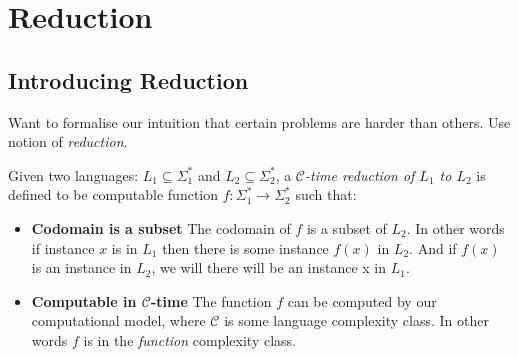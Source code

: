 
\chapter{Reduction}







\section{Introducing Reduction}


Want to formalise our intuition that certain problems are harder than
others. Use notion of \textit{reduction}.

Given two languages: $L_1 \subseteq \Sigma^{*}_1$
and $L_2 \subseteq \Sigma^{*}_2$, a \textit{$\mathcal{C}$-time reduction of $L_1$ to $L_2$}
is defined to be computable function $f : \Sigma^{*}_1 \rightarrow \Sigma^{*}_2$
such that:

\begin{itemize}   
\renewcommand{\labelitemi}{$\Box$}
\item \textbf{Codomain is a subset} The codomain of $f$ is a subset of  $L_2$. 
In other words if instance $x$ is in $L_1$ then there is some instance $f(x)$ in $L_2$. 
And if $f(x)$ is an instance in $L_2$, we will there will be an instance x in $L_1$. 
\item \textbf{Computable in $\mathcal{C}$-time} The function $f$ can be computed 
by our computational model, where $\mathcal{C}$ 
is some language complexity class. 
In other words $f$ is in the \textit{function} complexity class.
\end{itemize} 




